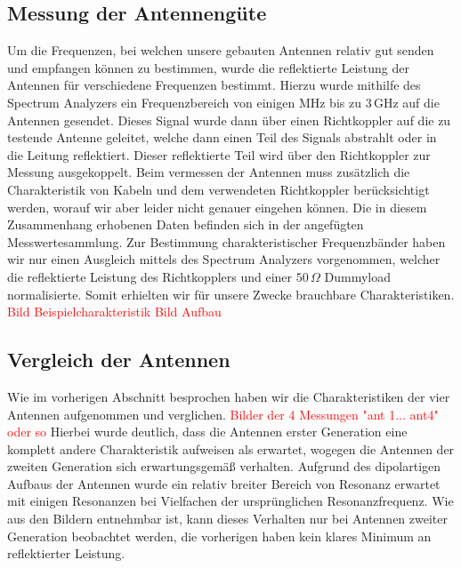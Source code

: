 \documentclass[titlepage,11pt,a4paper,ngerman]{article}
\begin{document}
\subsection{Messung der Antennengüte}
Um die Frequenzen, bei welchen unsere gebauten Antennen relativ gut senden und empfangen können zu bestimmen, wurde die reflektierte Leistung der Antennen für verschiedene Frequenzen bestimmt. Hierzu wurde mithilfe des Spectrum Analyzers ein Frequenzbereich von einigen MHz bis zu $3\,$GHz auf die Antennen gesendet. Dieses Signal wurde dann über einen Richtkoppler auf die zu testende Antenne geleitet, welche dann einen Teil des Signals abstrahlt oder in die Leitung reflektiert. Dieser reflektierte Teil wird über den Richtkoppler zur Messung ausgekoppelt. Beim vermessen der Antennen muss zusätzlich die Charakteristik von Kabeln und dem verwendeten Richtkoppler berücksichtigt werden, worauf wir aber leider nicht genauer eingehen können. Die in diesem Zusammenhang erhobenen Daten befinden sich in der angefügten Messwertesammlung. Zur Bestimmung charakteristischer Frequenzbänder haben wir nur einen Ausgleich mittels des Spectrum Analyzers vorgenommen, welcher die reflektierte Leistung des Richtkopplers und einer $50\,\Omega$  Dummyload normalisierte. Somit erhielten wir für unsere Zwecke brauchbare Charakteristiken. 
\textcolor{red}{Bild Beispielcharakteristik}
\textcolor{red}{Bild Aufbau}

\subsection{Vergleich der Antennen}
Wie im vorherigen Abschnitt besprochen haben wir die Charakteristiken der vier Antennen aufgenommen und verglichen.
\textcolor{red}{Bilder der 4 Messungen "ant 1... ant4" oder so}
Hierbei wurde deutlich, dass die Antennen erster Generation eine komplett andere Charakteristik aufweisen als erwartet, wogegen die Antennen der zweiten Generation sich erwartungsgemäß verhalten. Aufgrund des dipolartigen Aufbaus der Antennen wurde ein relativ breiter Bereich von Resonanz erwartet mit einigen Resonanzen bei Vielfachen der ursprünglichen Resonanzfrequenz. Wie aus den Bildern entnehmbar ist, kann dieses Verhalten nur bei Antennen zweiter Generation beobachtet werden, die vorherigen haben kein klares Minimum an reflektierter Leistung.
\end{document}
